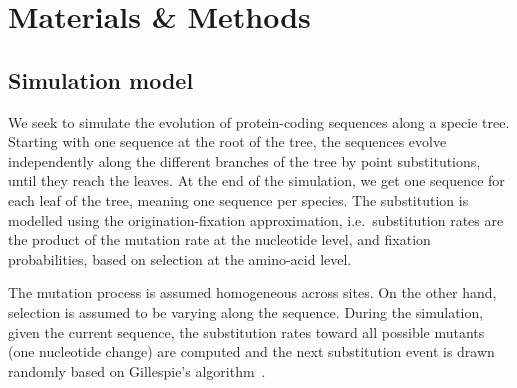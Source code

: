 \documentclass{article}
\begin{document}
\section{Materials \& Methods}

\subsection{Simulation model}
\label{sec:mut-bias-simu}
We seek to simulate the evolution of protein-coding sequences along a specie tree.
Starting with one sequence at the root of the tree, the sequences evolve independently along the different branches of the tree by point {substitutions}, until they reach the leaves.
At the end of the simulation, we get one sequence for each leaf of the tree, meaning one sequence per species.
The {substitution} is modelled using the origination-fixation approximation, i.e.~substitution rates are the product of the mutation rate at the nucleotide level, and fixation probabilities, based on selection at the amino-acid level.

The mutation process is assumed homogeneous across sites.
On the other hand, selection is assumed to be varying along the sequence.
During the simulation, given the current sequence, the {substitution} rates toward all possible mutants (one nucleotide change) are computed and the next {substitution} event is drawn randomly based on Gillespie's algorithm~\citep{Gillespie1977}.
\end{document}
